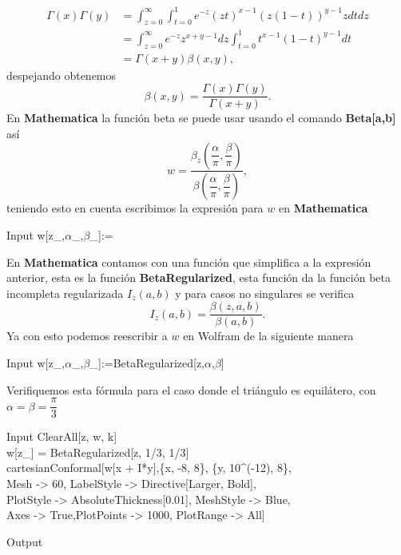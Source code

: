 \[
\displaystyle {\begin{aligned}\Gamma (x)\Gamma (y)&=\int _{z=0}^{\infty }\int _{t=0}^{1}e^{-z}(zt)^{x-1}(z(1-t))^{y-1}zdtdz\\&=\int _{z=0}^{\infty }e^{-z}z^{x+y-1}dz\int _{t=0}^{1}t^{x-1}(1-t)^{y-1}dt\\&=\Gamma (x+y)\beta (x,y),\end{aligned}}
\]
despejando obtenemos
\[
{\displaystyle \beta (x,y)={\dfrac {\Gamma (x)\Gamma (y)}{\Gamma (x+y)}}}.
\]
En \textbf{Mathematica} la función beta se puede usar usando el comando \textbf{Beta[a,b]}
así 
$$w=\dfrac{\beta_z\left(\dfrac{\alpha}{\pi},\dfrac{\beta}{\pi}\right)}{\beta\left(\dfrac{\alpha}{\pi},\dfrac{\beta}{\pi}\right)},$$
teniendo esto en cuenta escribimos la expresión para $w$ en \textbf{Mathematica}
\begin{mmaCell}{Input}
	 w[z_,\(\alpha\)_,\(\beta\)_]:=
\end{mmaCell}
En \textbf{Mathematica} contamos con una función que simplifica a la expresión anterior, esta es la función \textbf{BetaRegularized}, esta función da la función beta incompleta regularizada $I_z(a,b)$  y para casos no singulares se verifica 
$$I_z(a,b)=\dfrac{\beta(z,a,b)}{\beta(a,b)}.$$
Ya con esto podemos reescribir a $w$ en Wolfram de la siguiente manera
\begin{mmaCell}{Input}
	 w[z_,\(\alpha\)_,\(\beta\)_]:=BetaRegularized[z,\(\alpha\),\(\beta\)]
\end{mmaCell}
Verifiquemos esta fórmula para el caso donde el triángulo es equilátero, con $\alpha=\beta=\dfrac{\pi}{3}$
\begin{mmaCell}{Input}
	 ClearAll[z, w, k]\\w[z_] = BetaRegularized[z, 1/3, 1/3]\\cartesianConformal[w[x + I*y],\{x, -8, 8\}, \{y, 10^(-12), 8\},\\Mesh -> 60, LabelStyle -> Directive[Larger, Bold],\\PlotStyle -> AbsoluteThickness[0.01], MeshStyle -> Blue,\\Axes -> True,PlotPoints -> 1000, PlotRange -> All]
\end{mmaCell}
\begin{mmaCell}[moregraphics={moreig={scale=0.8}}]{Output}
\end{mmaCell}
